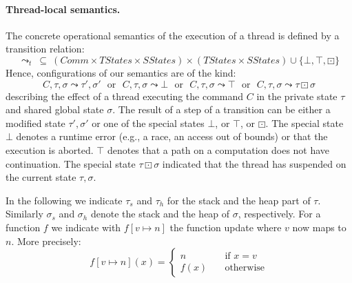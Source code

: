 \documentclass[a4paper,11pt]{llncs}
\newcommand{\wait}{\boxdot}
\newcommand{\sstates}{\mathit{SStates}}
\newcommand{\tstates}{\mathit{TStates}}
\newcounter{note_number}
\begin{document}
\paragraph{Thread-local semantics.}
The concrete operational semantics of the execution of a thread is defined by a transition relation: 
\[
\leadsto_t  \ \subseteq \  (Comm \times \tstates \times \sstates) \times (\tstates \times \sstates) \cup \{ \bot,\top, \wait \} 
\]
Hence, configurations of our semantics are of the kind: 
\[
  C,\tau,\sigma \leadsto \tau',\sigma' \mbox{ ~or~ } C,\tau,\sigma \leadsto \bot \mbox{ ~or~ } C,\tau,\sigma \leadsto \top \mbox{ ~or~ } C,\tau,\sigma \leadsto \tau \wait \sigma
\] describing the effect of a thread executing the command $C$ in the private state $\tau$ and shared global state $\sigma$.
The result of a step of a transition can be either a modified state $\tau',\sigma'$ or 
one of the special states $\bot$, or $\top$,  or $\wait$.
The special state $\bot$ denotes a runtime error (e.g., a race, an access out of bounds) or that the execution is aborted. $\top$ denotes that a path on a computation does not have continuation.
The special state $\tau \wait \sigma$ indicated that the thread has suspended on the current state $\tau,\sigma$.

In the following we indicate $\tau_s$ and $\tau_h$ for the stack and the heap part of $\tau$. Similarly $\sigma_s$ and $\sigma_h$ denote the stack and the heap of $\sigma$, respectively. For a function $f$ we indicate with $f[v \mapsto n]$ the function update where $v$ now maps to $n$. More precisely:
\[
   f[v \mapsto n](x) = \left\{\begin{array}{ll}
   	n & \quad \mbox{if $x=v$ } \\
	f(x) & \quad \mbox{otherwise}
	\end{array}\right.
\]
\end{document}
